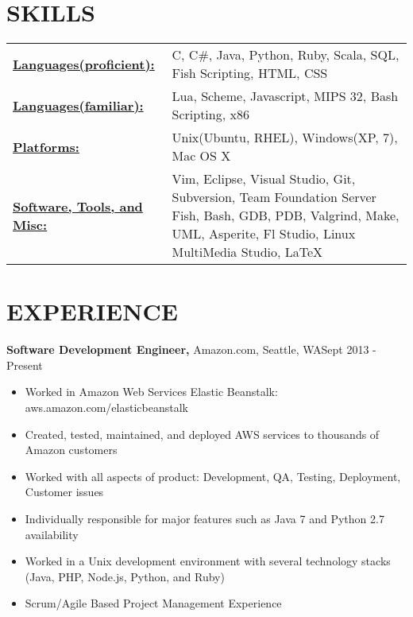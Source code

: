 \documentclass{res}
\begin{document}
 
\address{2226 Elliott Ave Apt 113, Seattle, WA 98121 (928) 284-5522 charliec364@gmail.com }


\begin{resume}
\footnotesize

\section{SKILLS}
   \begin{tabular}{l p{3in}}
     \underline{\bf Languages(proficient):} & C, C\#, Java, Python, Ruby, Scala, SQL, Fish Scripting, HTML, CSS \\
     \underline{\bf Languages(familiar):} & Lua, Scheme, Javascript, MIPS 32, Bash Scripting, x86 \\
     \underline{\bf Platforms:} & Unix(Ubuntu, RHEL), Windows(XP, 7), Mac OS X \\
     \underline{\bf Software, Tools, and Misc:} &  Vim, Eclipse, Visual Studio,
                        Git, Subversion, Team Foundation Server
                        Fish, Bash, GDB, PDB, Valgrind, Make, 
                        UML, Asperite, Fl Studio, Linux MultiMedia Studio, \LaTeX\
 \end{tabular}
 
\section{EXPERIENCE}
  {\bf Software Development Engineer,} Amazon.com, Seattle, WA\hfill Sept 2013 - Present
  \begin{itemize} \itemsep -2pt  %
    \item Worked in Amazon Web Services Elastic Beanstalk: aws.amazon.com/elasticbeanstalk
    \item Created, tested, maintained, and deployed AWS services to thousands of Amazon customers
    \item Worked with all aspects of product: Development, QA, Testing, Deployment, Customer issues
    \item Individually responsible for major features such as Java 7 and Python 2.7 availability
    \item Worked in a Unix development environment with several technology stacks (Java, PHP, Node.js, Python, and Ruby)
    \item Scrum/Agile Based Project Management Experience
  \end{itemize}


\end{resume}
\end{document}

